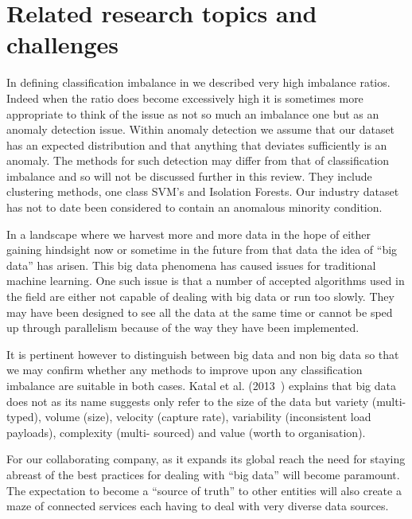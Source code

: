 \section{Related research topics and challenges} \label{sec:TopicsAndChallenges}
In defining classification imbalance in  we described very high imbalance ratios. Indeed when the ratio does become excessively high it is sometimes more appropriate to think of the issue as not so much an imbalance one but as an anomaly detection issue. Within anomaly detection we assume that our dataset has an expected distribution and that anything that deviates sufficiently is an anomaly. The methods for such detection may differ from that of classification imbalance and so will not be discussed further in this review. They include clustering methods, one class SVM's and Isolation Forests. Our industry dataset has not to date been considered to contain an anomalous minority condition.   
\par
In a landscape where we harvest more and more data in the hope of either gaining hindsight now or sometime in the future from that data the idea of ``big data'' has arisen. This big data phenomena has caused issues for traditional machine learning. One such issue is that a number of accepted algorithms used in the field are either not capable of dealing with big data or run too slowly. They may have been designed to see all the data at the same time or cannot be sped up through parallelism because of the way they have been implemented.
\par
It is pertinent however to distinguish between big data and non big data so that we may confirm whether any methods to improve upon any classification imbalance are suitable in both cases. Katal et al. (2013~\cite{katal2013big}) explains that big data does not as its name suggests only refer to the size of the data but variety (multi-typed), volume (size), velocity (capture rate), variability (inconsistent load payloads), complexity (multi- sourced) and value (worth to organisation).
\par
For our collaborating company, as it expands its global reach the need for staying abreast of the best practices for dealing with ``big data'' will become paramount. The expectation to become a ``source of truth'' to other entities will also create a maze of connected services each having to deal with very diverse data sources. 


